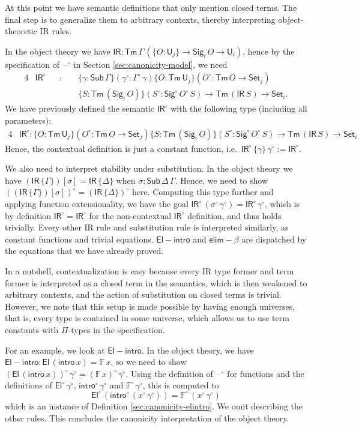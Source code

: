\documentclass[acmsmall,screen,review]{acmart}
\newcommand{\msf}[1]{{\mathsf{#1}}}
\newcommand{\mbb}[1]{\mathbb{#1}}
\newcommand{\U}{\msf{U}}
\newcommand{\Set}{\msf{Set}}
\newcommand{\El}{\msf{El}}
\newcommand{\Sig}{\msf{Sig}}
\newcommand{\blank}{{\mathord{\hspace{1pt}\text{--}\hspace{1pt}}}}
\newcommand{\IR}{\msf{IR}}
\newcommand{\intro}{\msf{intro}}
\newcommand{\elim}{\msf{elim}}
\newcommand{\Sub}{\msf{Sub}}
\newcommand{\Tm}{\msf{Tm}}
\newcommand{\w}{\circ}
\newcommand{\Elintro}{\msf{El\!\!-\!\!intro}}
\newcommand{\elimbeta}{\elim\!-\!\!\beta}
\newcommand{\F}{\mbb{F}}
\begin{document}
\begin{definition}
At this point we have semantic definitions that only mention closed terms. The final step is to
generalize them to arbitrary contexts, thereby interpreting object-theoretic IR rules.

In the object theory we have $\IR : \Tm\,\Gamma\,(\{O : \U_j\} \to \Sig_i\,O \to \U_i)$, hence by the specification
of $\blank^\w$ in Section \ref{sec:canonicity-model}, we need
\begin{alignat*}{4}
  & \IR^\w &&:\,\,&& \{\gamma : \Sub\,\Gamma\}(\gamma^\w : \Gamma^\w\,\gamma)\{O : \Tm\,\U_j\}(O^\w : \Tm\,O \to \Set_j)\\
  &         &&     && \{S : \Tm\,(\Sig_i\,O)\}(S^\w : \Sig^\w\,O^\w\,S) \to \Tm\,(\IR\,S) \to \Set_i.
\end{alignat*}
We have previously defined the semantic $\IR^\w$ with the following type (including all parameters):
\begin{alignat*}{4}
  & \IR^\w : \{O : \Tm\,\U_j\}(O^\w : \Tm\,O \to \Set_j)\{S : \Tm\,(\Sig_i\,O)\}(S^\w : \Sig^\w\,O^\w\,S) \to \Tm\,(\IR\,S) \to \Set_i
\end{alignat*}
Hence, the contextual definition is just a constant function, i.e.\ $\IR^\w\,\{\gamma\}\,\gamma^\w
:= \IR^\w$.

We also need to interpret stability under substitution. In the object theory we have
$(\IR\,\{\Gamma\})[\sigma] = \IR\,\{\Delta\}$ when $\sigma : \Sub\,\Delta\,\Gamma$. Hence, we need
to show $((\IR\,\{\Gamma\})[\sigma])^\w = (\IR\,\{\Delta\})^\w$ here. Computing this type further
and applying function extensionality, we have the goal $\IR^\w\,(\sigma^\w\,\gamma^\w) =
\IR^\w\,\gamma^\w$, which is by definition $\IR^\w = \IR^\w$ for the non-contextual $\IR^\w$
definition, and thus holds trivially. Every other IR rule and substitution rule is interpreted
similarly, as constant functions and trivial equations. $\Elintro$ and $\elimbeta$ are dispatched by
the equations that we have already proved.

In a nutshell, contextualization is easy because every IR type former and term former is interpreted
as a closed term in the semantics, which is then weakened to arbitrary contexts, and the action of
substitution on closed terms is trivial. However, we note that this setup is made possible by having
enough universes, that is, every type is contained in some universe, which allows us to use term constants
with $\Pi$-types in the specification.

For an example, we look at $\Elintro$. In the object theory, we have $\Elintro : \El\,(\intro\,x) =
\F\,x$, so we need to show $(\El\,(\intro\,x))^\w\,\gamma^\w = (\F\,x)^\w\,\gamma^\w$. Using the
definition of $\blank^\w$ for functions and the definitions of $\El^\w\,\gamma^\w$,
$\intro^\w\,\gamma^\w$ and $\F^\w\,\gamma^\w$, this is computed to
\[ \El^\w\,(\intro^\w\,(x^\w\,\gamma^\w)) = \F^\w\,(x^\w\,\gamma^\w) \]
which is an instance of Definition \ref{sec:canonicity-elintro}. We omit describing the other
rules. This concludes the canonicity interpretation of the object theory.
\end{definition}
\end{document}
